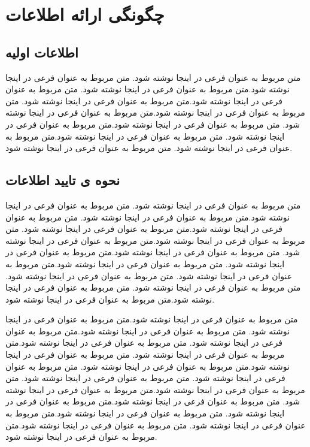 \chapter{چگونگی ارائه اطلاعات}

\section{اطلاعات اولیه}
 متن مربوط به عنوان فرعی در اینجا نوشته شود. متن مربوط به عنوان فرعی در اینجا نوشته شود.متن مربوط به عنوان فرعی در اینجا نوشته شود. متن مربوط به عنوان فرعی در اینجا نوشته شود.متن مربوط به عنوان فرعی در اینجا نوشته شود. متن مربوط به عنوان فرعی در اینجا نوشته شود.متن مربوط به عنوان فرعی در اینجا نوشته شود. متن مربوط به عنوان فرعی در اینجا نوشته شود.متن مربوط به عنوان فرعی در اینجا نوشته شود. متن مربوط به عنوان فرعی در اینجا نوشته شود.متن مربوط به عنوان فرعی در اینجا نوشته شود. متن مربوط به عنوان فرعی در اینجا نوشته شود. 

 \section{نحوه ی تایید اطلاعات}
   متن مربوط به عنوان فرعی در اینجا نوشته شود. متن مربوط به عنوان فرعی در اینجا نوشته شود.متن مربوط به عنوان فرعی در اینجا نوشته شود. متن مربوط به عنوان فرعی در اینجا نوشته شود.متن مربوط به عنوان فرعی در اینجا نوشته شود. متن مربوط به عنوان فرعی در اینجا نوشته شود.متن مربوط به عنوان فرعی در اینجا نوشته شود. متن مربوط به عنوان فرعی در اینجا نوشته شود.متن مربوط به عنوان فرعی در اینجا نوشته شود. متن مربوط به عنوان فرعی در اینجا نوشته شود.متن مربوط به عنوان فرعی در اینجا نوشته شود. متن مربوط به عنوان فرعی در اینجا نوشته شود. متن مربوط به عنوان فرعی در اینجا نوشته شود. متن مربوط به عنوان فرعی در اینجا نوشته شود.متن مربوط به عنوان فرعی در اینجا نوشته شود.
   
    متن مربوط به عنوان فرعی در اینجا نوشته شود.متن مربوط به عنوان فرعی در اینجا نوشته شود. متن مربوط به عنوان فرعی در اینجا نوشته شود.متن مربوط به عنوان فرعی در اینجا نوشته شود. متن مربوط به عنوان فرعی در اینجا نوشته شود.متن مربوط به عنوان فرعی در اینجا نوشته شود. متن مربوط به عنوان فرعی در اینجا نوشته شود.متن مربوط به عنوان فرعی در اینجا نوشته شود. متن مربوط به عنوان فرعی در اینجا نوشته شود. متن مربوط به عنوان فرعی در اینجا نوشته شود. متن مربوط به عنوان فرعی در اینجا نوشته شود.متن مربوط به عنوان فرعی در اینجا نوشته شود. متن مربوط به عنوان فرعی در اینجا نوشته شود.متن مربوط به عنوان فرعی در اینجا نوشته شود. متن مربوط به عنوان فرعی در اینجا نوشته شود.متن مربوط به عنوان فرعی در اینجا نوشته شود. متن مربوط به عنوان فرعی در اینجا نوشته شود.متن مربوط به عنوان فرعی در اینجا نوشته شود. 
    

